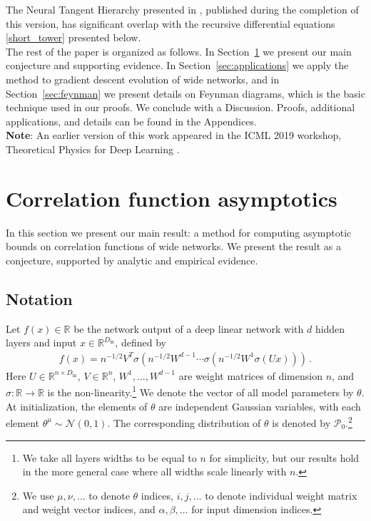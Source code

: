 \documentclass[english]{article}
\newcommand{\bR}{\ensuremath{\mathbb{R}}}
\newcommand{\cN}{\ensuremath{\mathcal{N}}}
\newcommand{\cP}{\ensuremath{\mathcal{P}}}
\newcommand{\Din}{\ensuremath{D_{\mathrm{in}}}}
\newcommand{\pcite}[1]{\cite{#1}}
\begin{document}
The Neural Tangent Hierarchy presented in \pcite{huang2019dynamics}, published during the completion of this version, has significant overlap with the recursive differential equations \eqref{short_tower} presented below.
\\

The rest of the paper is organized as follows.
In Section~\ref{sec:main} we present our main conjecture and supporting evidence.
In Section~\ref{sec:applications} we apply the method to gradient descent evolution of wide networks, and 
in Section~\ref{sec:feynman} we present details on Feynman diagrams, which is the basic technique used in our proofs.
We conclude with a Discussion.
Proofs, additional applications, and details can be found in the Appendices.
\\

\noindent\textbf{Note}: An earlier version of this work appeared in the ICML 2019 workshop, Theoretical Physics for Deep Learning \pcite{fdworkshop}.
\section{Correlation function asymptotics}\label{sec:main}

In this section we present our main result: a method for computing asymptotic bounds on correlation functions of wide networks.
We present the result as a conjecture, supported by analytic and empirical evidence.

\subsection{Notation}\label{sec:notation}
Let $f(x) \in \bR$ be the network output of a deep linear network with $d$ hidden layers and input $x \in \bR^{\Din}$, defined by
\begin{align}
  f(x) = n^{-1/2} V^T \sigma(n^{-1/2} W^{d-1} \cdots \sigma(n^{-1/2} W^1 \sigma(U x))) \,. \label{eq:fdl}
\end{align}
Here $U \in \bR^{n \times \Din}$, $V \in \bR^n$, $W^1,\dots,W^{d-1}$ are weight matrices of dimension $n$, and $\sigma:\bR\to\bR$ is the non-linearity.\footnote{
We take all layers widths to be equal to $n$ for simplicity, but our results hold in the more general case where all widths scale linearly with $n$.}
We denote the vector of all model parameters by $\theta$.
At initialization, the elements of $\theta$ are independent Gaussian variables, with each element $\theta^\mu \sim \cN(0,1)$.
The corresponding distribution of $\theta$ is denoted by $\cP_0$.\footnote{
We use $\mu,\nu,\dots$ to denote $\theta$ indices, $i,j,\dots$ to denote individual weight matrix and weight vector indices, and $\alpha,\beta,\dots$ for input dimension indices.}
\end{document}
